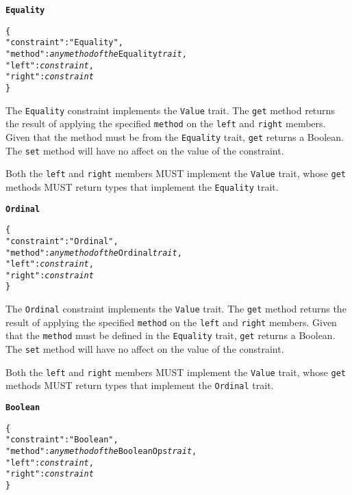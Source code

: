 \documentclass[10pt,twocolumn,a4paper]{article}
\newcommand{\code}[1]{\texttt{#1}}
\begin{document}
\textbf{\texttt{Equality}}

\footnotesize
\begin{alltt}
  \{
    "constraint"   : "Equality",
    "method"       : \emph{any method of the} Equality \emph{trait},
    "left"         : \emph{constraint},
    "right"        : \emph{constraint}
  \}
\end{alltt}
\normalsize

The \code{Equality} constraint implements the \code{Value} trait. The \code{get} method
returns the result of applying the specified \code{method} on the \code{left} and
\code{right} members. Given that the method must be from the \code{Equality} trait,
\code{get} returns a Boolean. The \code{set} method will have no affect on the value of
the constraint.

Both the \code{left} and \code{right} members MUST implement the \code{Value} trait, whose
\code{get} methods MUST return types that implement the \code{Equality} trait.

\textbf{\texttt{Ordinal}}

\footnotesize
\begin{alltt}
  \{
    "constraint"   : "Ordinal",
    "method"       : \emph{any method of the} Ordinal \emph{trait},
    "left"         : \emph{constraint},
    "right"        : \emph{constraint}
  \}
\end{alltt}
\normalsize

The \code{Ordinal} constraint implements the \code{Value} trait. The \code{get} method
returns the result of applying the specified \code{method} on the \code{left} and
\code{right} members. Given that the \code{method} must be defined in the \code{Equality}
trait, \code{get} returns a Boolean. The \code{set} method will have no affect on the
value of the constraint.

Both the \code{left} and \code{right} members MUST implement the \code{Value} trait, whose
\code{get} methods MUST return types that implement the \code{Ordinal} trait.

\textbf{\texttt{Boolean}}

\footnotesize
\begin{alltt}
  \{
    "constraint"   : "Boolean",
    "method"       : \emph{any method of the} BooleanOps \emph{trait},
    "left"         : \emph{constraint},
    "right"        : \emph{constraint}
  \}
\end{alltt}
\normalsize
\end{document}
